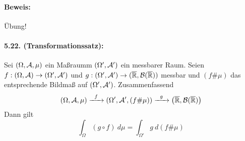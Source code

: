  \paragraph{Beweis:}\"Ubung!
 
 \paragraph{5.22. (Transformationssatz):}Sei $(\Omega,\mathcal{A},\mu)$ ein Ma\ss{}raumm $(\Omega',\mathcal{A}')$ ein messbarer Raum. Seien $f:(\Omega,\mathcal{A})\to(\Omega',\mathcal{A}')$ und $g:(\Omega',\mathcal{A}')\to(\overline{\mathbb{R}},\mathcal{B}(\overline{\mathbb{R}}))$ messbar und $(f\#\mu)$ das entsprechende Bildma\ss{} auf $(\Omega',\mathcal{A}')$. Zusammenfassend
 $$\left(\Omega,\A,\mu\right)\nto{f}{}\left(\Omega',\A',(f\#\mu)\right)\nto{g}{}\left(\overline\R,\cB(\overline\R)\right)$$
 Dann gilt
 $$\int_{\Omega}(g\circ f)\ d\mu=\int_{\Omega'}g\ d(f\#\mu)$$
 
